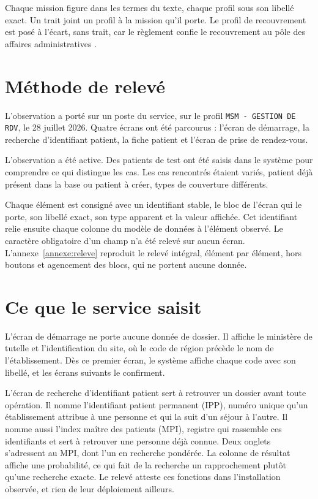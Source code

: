 Chaque mission figure dans les termes du texte, chaque profil sous son libellé exact. Un trait joint
un profil à la mission qu'il porte. Le profil de recouvrement est posé à l'écart, sans trait, car le
règlement confie le recouvrement au pôle des affaires administratives \cite{s27}.

\medskip

\section{Méthode de relevé}

L'observation a porté sur un poste du service, sur le profil \texttt{MSM - GESTION DE RDV}, le
28 juillet 2026. Quatre écrans ont été parcourus : l'écran de démarrage, la recherche d'identifiant
patient, la fiche patient et l'écran de prise de rendez-vous.

L'observation a été active. Des patients de test ont été saisis dans le système pour comprendre ce
qui distingue les cas. Les cas rencontrés étaient variés, patient déjà présent dans la base ou
patient à créer, types de couverture différents.

Chaque élément est consigné avec un identifiant stable, le bloc de l'écran qui le porte, son libellé
exact, son type apparent et la valeur affichée. Cet identifiant relie ensuite chaque colonne du
modèle de données à l'élément observé. Le caractère obligatoire d'un champ n'a été relevé sur aucun
écran. L'annexe~\ref{annexe:releve} reproduit le relevé intégral, élément par élément, hors boutons
et agencement des blocs, qui ne portent aucune donnée.

\section{Ce que le service saisit}

L'écran de démarrage ne porte aucune donnée de dossier. Il affiche le ministère de tutelle et
l'identification du site, où le code de région précède le nom de l'établissement.
Dès ce premier écran, le système affiche chaque code avec son libellé, et les écrans suivants le
confirment.

L'écran de recherche d'identifiant patient sert à retrouver un dossier avant toute opération. Il
nomme l'identifiant patient permanent (IPP), numéro unique qu'un établissement attribue à une
personne et qui la suit d'un séjour à l'autre. Il nomme aussi l'index maître des patients (MPI),
registre qui rassemble ces identifiants et sert à retrouver une personne déjà connue. Deux onglets
s'adressent au MPI, dont l'un en recherche pondérée. La
colonne de résultat affiche une probabilité, ce qui fait de la recherche un
rapprochement plutôt qu'une recherche exacte. Le relevé atteste ces fonctions dans l'installation
observée, et rien de leur déploiement ailleurs.

